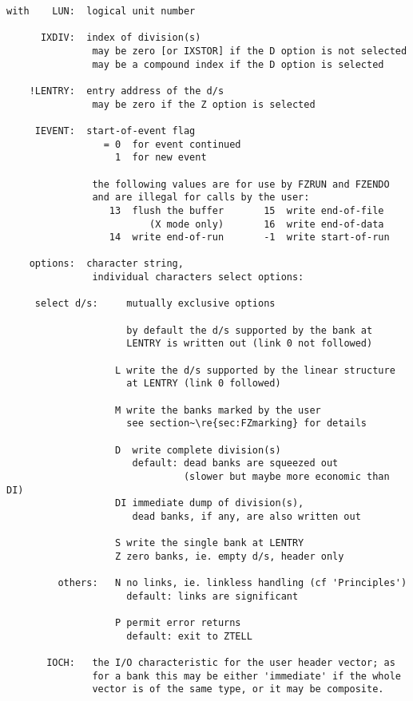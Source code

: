 \begin{verbatim}
with    LUN:  logical unit number

      IXDIV:  index of division(s)
               may be zero [or IXSTOR] if the D option is not selected
               may be a compound index if the D option is selected

    !LENTRY:  entry address of the d/s
               may be zero if the Z option is selected

     IEVENT:  start-of-event flag
                 = 0  for event continued
                   1  for new event

               the following values are for use by FZRUN and FZENDO
               and are illegal for calls by the user:
                  13  flush the buffer       15  write end-of-file
                         (X mode only)       16  write end-of-data
                  14  write end-of-run       -1  write start-of-run

    options:  character string,
               individual characters select options:

     select d/s:     mutually exclusive options

                     by default the d/s supported by the bank at
                     LENTRY is written out (link 0 not followed)

                   L write the d/s supported by the linear structure
                     at LENTRY (link 0 followed)

                   M write the banks marked by the user
                     see section~\re{sec:FZmarking} for details

                   D  write complete division(s)
                      default: dead banks are squeezed out
                               (slower but maybe more economic than DI)
                   DI immediate dump of division(s),
                      dead banks, if any, are also written out

                   S write the single bank at LENTRY
                   Z zero banks, ie. empty d/s, header only

         others:   N no links, ie. linkless handling (cf 'Principles')
                     default: links are significant

                   P permit error returns
                     default: exit to ZTELL

       IOCH:   the I/O characteristic for the user header vector; as
               for a bank this may be either 'immediate' if the whole
               vector is of the same type, or it may be composite.


\end{verbatim}
